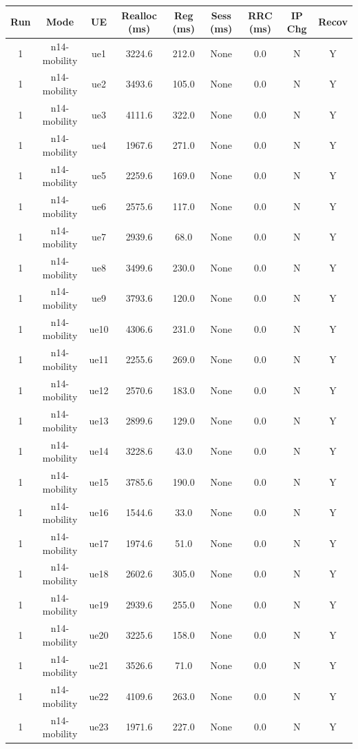 \begin{table}[ht]
\centering
\begin{tabular}{|c|c|c|c|c|c|c|c|c|}
\hline
Run & Mode & UE & Realloc (ms) & Reg (ms) & Sess (ms) & RRC (ms) & IP Chg & Recov \\
\hline
1 & n14-mobility & ue1 & 3224.6 & 212.0 & None & 0.0 & N & Y \\
1 & n14-mobility & ue2 & 3493.6 & 105.0 & None & 0.0 & N & Y \\
1 & n14-mobility & ue3 & 4111.6 & 322.0 & None & 0.0 & N & Y \\
1 & n14-mobility & ue4 & 1967.6 & 271.0 & None & 0.0 & N & Y \\
1 & n14-mobility & ue5 & 2259.6 & 169.0 & None & 0.0 & N & Y \\
1 & n14-mobility & ue6 & 2575.6 & 117.0 & None & 0.0 & N & Y \\
1 & n14-mobility & ue7 & 2939.6 & 68.0 & None & 0.0 & N & Y \\
1 & n14-mobility & ue8 & 3499.6 & 230.0 & None & 0.0 & N & Y \\
1 & n14-mobility & ue9 & 3793.6 & 120.0 & None & 0.0 & N & Y \\
1 & n14-mobility & ue10 & 4306.6 & 231.0 & None & 0.0 & N & Y \\
1 & n14-mobility & ue11 & 2255.6 & 269.0 & None & 0.0 & N & Y \\
1 & n14-mobility & ue12 & 2570.6 & 183.0 & None & 0.0 & N & Y \\
1 & n14-mobility & ue13 & 2899.6 & 129.0 & None & 0.0 & N & Y \\
1 & n14-mobility & ue14 & 3228.6 & 43.0 & None & 0.0 & N & Y \\
1 & n14-mobility & ue15 & 3785.6 & 190.0 & None & 0.0 & N & Y \\
1 & n14-mobility & ue16 & 1544.6 & 33.0 & None & 0.0 & N & Y \\
1 & n14-mobility & ue17 & 1974.6 & 51.0 & None & 0.0 & N & Y \\
1 & n14-mobility & ue18 & 2602.6 & 305.0 & None & 0.0 & N & Y \\
1 & n14-mobility & ue19 & 2939.6 & 255.0 & None & 0.0 & N & Y \\
1 & n14-mobility & ue20 & 3225.6 & 158.0 & None & 0.0 & N & Y \\
1 & n14-mobility & ue21 & 3526.6 & 71.0 & None & 0.0 & N & Y \\
1 & n14-mobility & ue22 & 4109.6 & 263.0 & None & 0.0 & N & Y \\
1 & n14-mobility & ue23 & 1971.6 & 227.0 & None & 0.0 & N & Y \\

\end{tabular}
\end{table}
